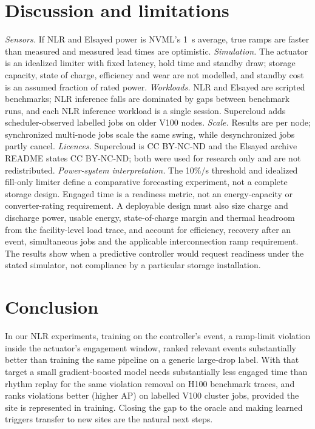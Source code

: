 \documentclass[conference]{IEEEtran}
\begin{document}
\section{Discussion and limitations}
\emph{Sensors.} If NLR and Elsayed power is NVML's 1~s average, true ramps are faster than measured and
measured lead times are optimistic. \emph{Simulation.} The actuator is an idealized limiter with fixed
latency, hold time and standby draw; storage capacity, state of charge, efficiency and wear are not modelled, and standby cost is an
assumed fraction of rated power.
\emph{Workloads.} NLR and Elsayed are scripted benchmarks; NLR inference falls are dominated by gaps
between benchmark runs, and each NLR inference workload is a single session. Supercloud adds
scheduler-observed labelled jobs on older V100 nodes. \emph{Scale.} Results are per node; synchronized multi-node jobs scale the same
swing, while desynchronized jobs partly cancel. \emph{Licences.} Supercloud is CC BY-NC-ND and the Elsayed
archive README states CC BY-NC-ND; both were used for research only and are not redistributed.
\emph{Power-system interpretation.} The 10\%/s threshold and idealized fill-only limiter define a
comparative forecasting experiment, not a complete storage design. Engaged time is a readiness metric,
not an energy-capacity or converter-rating requirement. A deployable design must also size charge and
discharge power, usable energy, state-of-charge margin and thermal headroom from the facility-level load
trace, and account for efficiency, recovery after an event, simultaneous jobs and the applicable
interconnection ramp requirement. The results show when a predictive controller would request readiness
under the stated simulator, not compliance by a particular storage installation.

\section{Conclusion}
In our NLR experiments, training on the controller's event, a ramp-limit violation inside the actuator's
engagement window, ranked relevant events substantially better than training the same pipeline on a
generic large-drop label. With that target a small gradient-boosted model needs substantially less engaged time than rhythm replay for
the same violation removal on H100 benchmark traces, and ranks violations better (higher AP) on labelled
V100 cluster jobs, provided the site is represented in training. Closing the gap to the oracle and making learned triggers transfer to
new sites are the natural next steps.
\end{document}
